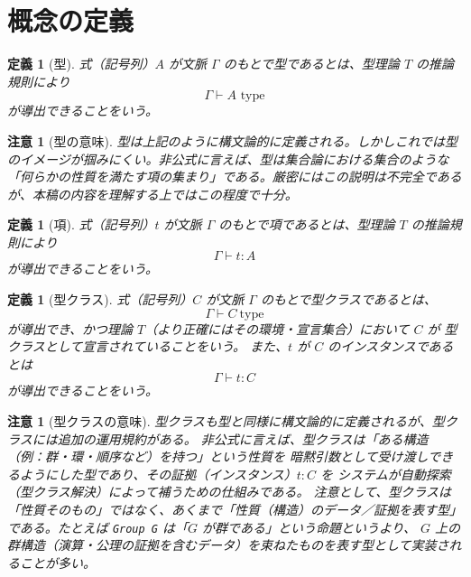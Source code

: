 \documentclass[a4paper,12pt]{bxjsbook}
\theoremstyle{theorem}
\newtheorem{definition}[theorem]{定義}
\newtheorem{remark}[theorem]{注意}
\begin{document}
    \section{概念の定義}
    \begin{definition}[型]
        式（記号列）$A$ が文脈 $\Gamma$ のもとで型であるとは、型理論 $T$ の推論規則により
        \[
            \Gamma \vdash A \text{ type}
        \]
        が導出できることをいう。
    \end{definition}

    \begin{remark}[型の意味]
        型は上記のように構文論的に定義される。しかしこれでは型のイメージが掴みにくい。非公式に言えば、型は集合論における集合のような「何らかの性質を満たす項の集まり」である。厳密にはこの説明は不完全であるが、本稿の内容を理解する上ではこの程度で十分。
    \end{remark}

    \begin{definition}[項]
        式（記号列）$t$ が文脈 $\Gamma$ のもとで項であるとは、型理論 $T$ の推論規則により
        \[
            \Gamma \vdash t : A
        \]
        が導出できることをいう。
    \end{definition}

    \begin{definition}[型クラス]
        式（記号列）$C$ が文脈 $\Gamma$ のもとで型クラスであるとは、
        \[
            \Gamma \vdash C\ \text{type}
        \]
        が導出でき、かつ理論 $T$（より正確にはその環境・宣言集合）において $C$ が \emph{型クラスとして宣言されている}ことをいう。
        また、$t$ が $C$ の\emph{インスタンス}であるとは
        \[
            \Gamma \vdash t : C
        \]
        が導出できることをいう。
    \end{definition}

    \begin{remark}[型クラスの意味]
        型クラスも型と同様に構文論的に定義されるが、型クラスには追加の運用規約がある。
        非公式に言えば、型クラスは「ある構造（例：群・環・順序など）を持つ」という性質を \emph{暗黙引数として受け渡し}できるようにした型であり、その証拠（インスタンス）$t:C$ を システムが自動探索（型クラス解決）によって補うための仕組みである。
        注意として、型クラスは「性質そのもの」ではなく、あくまで「性質（構造）のデータ／証拠を表す型」 である。たとえば \texttt{Group G} は「$G$ が群である」という命題というより、 $G$ 上の群構造（演算・公理の証拠を含むデータ）を束ねたものを表す型として実装されることが多い。
    \end{remark}
\end{document}
